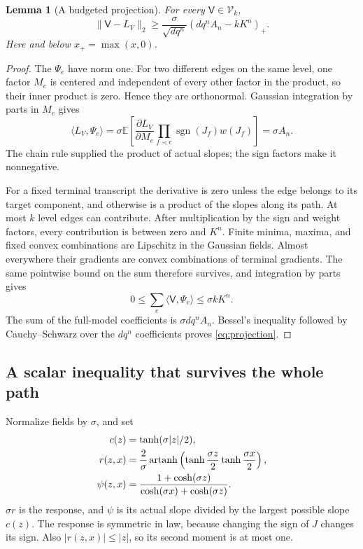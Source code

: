 \documentclass[11pt]{article}
\newtheorem{lemma}[theorem]{Lemma}
\theoremstyle{definition}
\theoremstyle{remark}
\DeclareMathOperator{\sgn}{sgn}
\DeclareMathOperator{\artanh}{artanh}
\newcommand{\E}{\mathbb E}
\newcommand{\Vcl}{\mathcal V}
\begin{document}
\begin{lemma}[A budgeted projection]
\label{lem:projection}
For every $\mathsf V\in\Vcl_k$,
\begin{equation}
 \|\mathsf V-L_V\|_2\ge\frac{\sigma}{\sqrt{dq^n}}
                         (dq^n A_n-kK^n)_+.
 \label{eq:projection}
\end{equation}
Here and below $x_+=\max(x,0)$.
\end{lemma}
\begin{proof}
The $\Psi_e$ have norm one. For two different edges on the same level,
one factor $M_e$ is centered and independent of every other factor in the
product, so their inner product is zero. Hence they are orthonormal.
Gaussian integration by parts in $M_e$ gives
\[
 \langle L_V,\Psi_e\rangle
 =\sigma\E\left[\frac{\partial L_V}{\partial M_e}
             \prod_{f\prec e}\sgn(J_f)w(J_f)\right]=\sigma A_n.
\]
The chain rule supplied the product of actual slopes; the sign factors
make it nonnegative.

For a fixed terminal transcript the derivative is zero unless the edge
belongs to its target component, and otherwise is a product of the slopes
along its path. At most $k$ level edges can contribute. After multiplication
by the sign and weight factors, every contribution is between zero and
$K^n$. Finite minima, maxima, and fixed convex combinations are Lipschitz
in the Gaussian fields. Almost everywhere their gradients are convex
combinations of terminal gradients. The same pointwise bound on the sum
therefore survives, and integration by parts gives
\[
 0\le\sum_e\langle\mathsf V,\Psi_e\rangle\le\sigma kK^n.
\]
The sum of the full-model coefficients is $\sigma dq^n A_n$.
Bessel's inequality followed by Cauchy--Schwarz over the $dq^n$ coefficients
proves \eqref{eq:projection}.
\end{proof}

\subsection{A scalar inequality that survives the whole path}
Normalize fields by $\sigma$, and set
\begin{align}
 c(z)&=\tanh(\sigma|z|/2),\notag\\
 r(z,x)&=\frac2\sigma\artanh\left(\tanh\frac{\sigma z}{2}
                                      \tanh\frac{\sigma x}{2}\right),\notag\\
 \psi(z,x)&=\frac{1+\cosh(\sigma z)}{\cosh(\sigma x)+\cosh(\sigma z)}.
 \label{eq:normalized}
\end{align}
$\sigma r$ is the response, and $\psi$ is its actual slope divided by the
largest possible slope $c(z)$. The response is symmetric in law, because
changing the sign of $J$ changes its sign. Also $|r(z,x)|\le|z|$, so its
second moment is at most one.
\end{document}
